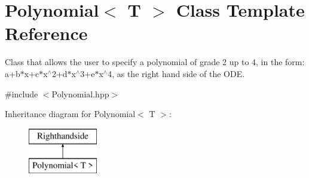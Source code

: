 \hypertarget{class_polynomial}{}\section{Polynomial$<$ T $>$ Class Template Reference}
\label{class_polynomial}


Class that allows the user to specify a polynomial of grade 2 up to 4, in the form\+: a+b$\ast$x+c$\ast$x$^\wedge$2+d$\ast$x$^\wedge$3+e$\ast$x$^\wedge$4, as the right hand side of the O\+D\+E.  




{\ttfamily \#include $<$Polynomial.\+hpp$>$}

Inheritance diagram for Polynomial$<$ T $>$\+:\begin{figure}[H]
\begin{center}
\leavevmode
\includegraphics[height=2.000000cm]{class_polynomial}
\end{center}
\end{figure}
